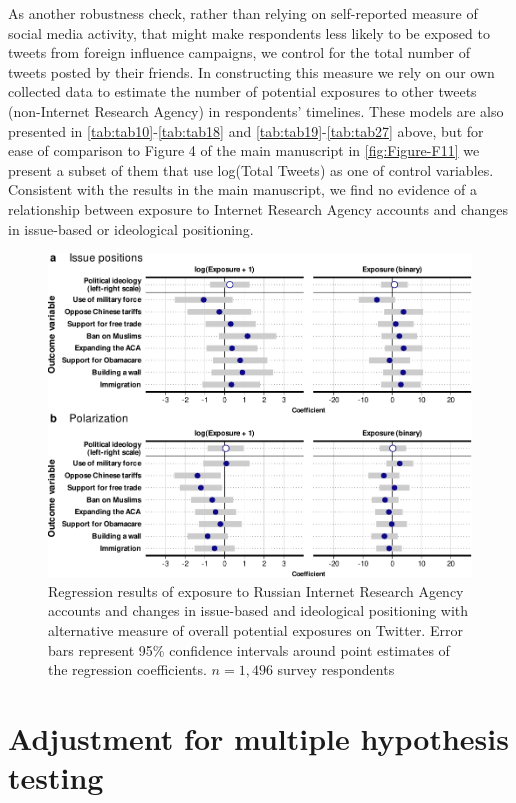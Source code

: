 \documentclass[
  12pt,
]{article}
\begin{document}
As another robustness check, rather than relying on self-reported measure of social media activity, that might make respondents less likely to be exposed to tweets from foreign influence campaigns, we control for the total number of tweets posted by their friends. In constructing this measure we rely on our own collected data to estimate the number of potential exposures to other tweets (non-Internet Research Agency) in respondents' timelines. These models are also presented in \ref{tab:tab10}-\ref{tab:tab18} and \ref{tab:tab19}-\ref{tab:tab27} above, but for ease of comparison to Figure 4 of the main manuscript in \autoref{fig:Figure-F11} we present a subset of them that use log(Total Tweets) as one of control variables. Consistent with the results in the main manuscript, we find no evidence of a relationship between exposure to Internet Research Agency accounts and changes in issue-based or ideological positioning.

\begin{figure}
\centering
\includegraphics{Appendix_files/figure-latex/Figure-F11-1.pdf}
\caption{\label{fig:Figure-F11}Regression results of exposure to Russian Internet Research Agency accounts and changes in issue-based and ideological positioning with alternative measure of overall potential exposures on Twitter. Error bars represent 95\% confidence intervals around point estimates of the regression coefficients. \(n = 1,496\) survey respondents}
\end{figure}

\clearpage

\hypertarget{adjustment-for-multiple-hypothesis-testing}{%
\section{Adjustment for multiple hypothesis testing}\label{adjustment-for-multiple-hypothesis-testing}}
\end{document}

